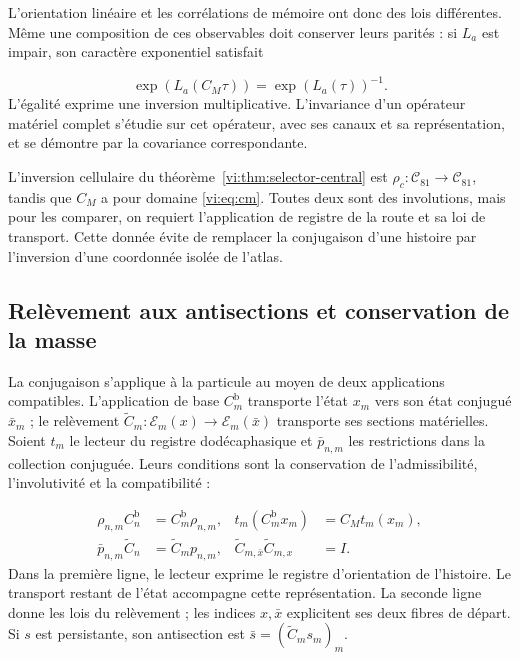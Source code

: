 L’orientation linéaire et les corrélations de mémoire ont donc
des lois différentes. Même une composition de ces observables doit
conserver leurs parités : si $L_a$ est impair, son caractère exponentiel
satisfait

\begin{equation}
 \exp(L_a(C_M\tau))=\exp(L_a(\tau))^{-1}.
 \label{vi:eq:caracter-inverso}
\end{equation}
L’égalité exprime une inversion multiplicative. L’invariance d’un
opérateur matériel complet s’étudie sur cet opérateur, avec ses
canaux et sa représentation, et se démontre par la covariance
correspondante.


L’inversion cellulaire du théorème~\ref{vi:thm:selector-central} est
$\rho_c:\mathcal C_{81}\to\mathcal C_{81}$, tandis que $C_M$ a pour
domaine \eqref{vi:eq:cm}. Toutes deux sont des involutions, mais pour
les comparer, on requiert l’application de registre de la route et sa loi de
transport. Cette donnée évite de remplacer la conjugaison d’une histoire
par l’inversion d’une coordonnée isolée de l’atlas.


\subsection{Relèvement aux antisections et conservation de la masse
}
\label{vi:subsec:antisecciones}

La conjugaison s’applique à la particule au moyen de deux applications
compatibles. L’application de base $C_m^{\mathrm b}$ transporte l’état
$x_m$ vers son état conjugué $\bar x_m$ ; le relèvement
$\widetilde C_m:\mathscr E_m(x)\to\mathscr E_m(\bar x)$
transporte ses sections matérielles. Soient $t_m$ le lecteur du
registre dodécaphasique et $\bar p_{n,m}$ les restrictions dans la
collection conjuguée. Leurs conditions sont la conservation de
l’admissibilité, l’involutivité et la compatibilité :

\begin{equation}
 \begin{aligned}
 \rho_{n,m}C_n^{\mathrm b}&=C_m^{\mathrm b}\rho_{n,m},
 &t_m(C_m^{\mathrm b}x_m)&=C_Mt_m(x_m),\\
 \bar p_{n,m}\widetilde C_n&=\widetilde C_mp_{n,m},
 &\widetilde C_{m,\bar x}\widetilde C_{m,x}&=I.
 \end{aligned}
 \label{vi:eq:levantamiento-cm}
\end{equation}
Dans la première ligne, le lecteur exprime le registre d’orientation
de l’histoire. Le transport restant de l’état accompagne cette
représentation. La seconde ligne donne les lois du relèvement ;
les indices $x,\bar x$ explicitent ses deux fibres de départ.
Si $s$ est persistante, son antisection est
$\bar s=(\widetilde C_ms_m)_m$.


